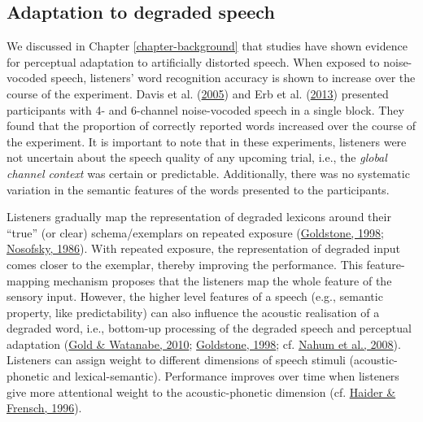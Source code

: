 \documentclass[a4paper, nobind]{templates/ociamthesis}
\begin{document}
\hypertarget{adaptation-to-degraded-speech}{%
\subsection{Adaptation to degraded speech}\label{adaptation-to-degraded-speech}}

We discussed in Chapter \ref{chapter-background} that studies have shown evidence for perceptual adaptation to artificially distorted speech.
When exposed to noise-vocoded speech, listeners' word recognition accuracy is shown to increase over the course of the experiment.
Davis et al. (\protect\hyperlink{ref-Davis2005}{2005}) and Erb et al. (\protect\hyperlink{ref-Erb2013}{2013}) presented participants with 4- and 6-channel noise-vocoded speech in a single block.
They found that the proportion of correctly reported words increased over the course of the experiment.
It is important to note that in these experiments, listeners were not uncertain about the speech quality of any upcoming trial,
i.e., the \emph{global channel context} was certain or predictable.
Additionally, there was no systematic variation in the semantic features of the words presented to the participants.

Listeners gradually map the representation of degraded lexicons around their ``true'' (or clear) schema/exemplars on repeated exposure (\protect\hyperlink{ref-Goldstone1998}{Goldstone, 1998}; \protect\hyperlink{ref-Nosofsky1986}{Nosofsky, 1986}).
With repeated exposure, the representation of degraded input comes closer to the exemplar, thereby improving the performance.
This feature-mapping mechanism proposes that the listeners map the whole feature of the sensory input.
However, the higher level features of a speech (e.g., semantic property, like predictability) can also influence the acoustic realisation of a degraded word,
i.e., bottom-up processing of the degraded speech and perceptual adaptation (\protect\hyperlink{ref-Gold2010}{Gold \& Watanabe, 2010}; \protect\hyperlink{ref-Goldstone1998}{Goldstone, 1998}; cf. \protect\hyperlink{ref-Nahum2008}{Nahum et al., 2008}).
Listeners can assign weight to different dimensions of speech stimuli (acoustic-phonetic and lexical-semantic).
Performance improves over time when listeners give more attentional weight to the acoustic-phonetic dimension (cf. \protect\hyperlink{ref-Haider1996}{Haider \& Frensch, 1996}).
\end{document}
